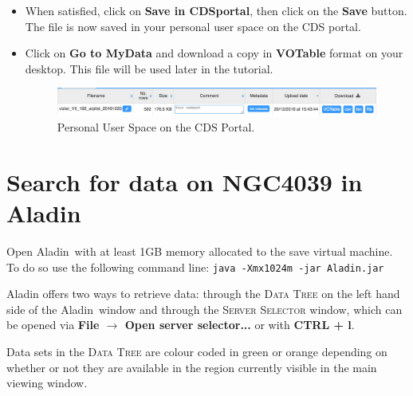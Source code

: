 \documentclass [a4paper, 12pt]{article}
\newcommand{\aladin}{{\textsc{A}{ladin}}}
\begin{document}
\begin{itemize}
\item When satisfied, click on \textbf{Save in CDSportal}, then click 
on the \textbf{Save} button. The file is now saved in your personal 
user space on the CDS portal.
\item Click on \textbf{Go to MyData} and download a copy in 
\textbf{VOTable} format on your desktop. This file will be used later 
in the tutorial.
\begin{figure}[H]
\center
\includegraphics[width=1  \textwidth]{../images/cdsportal_mydata.jpg}
\caption{Personal User Space on the CDS Portal.}
\label{fig:download}
\end{figure}
\end{itemize}



\section{Search for data on NGC4039 in \aladin}

Open \aladin\ with at least 1GB memory allocated to the save virtual 
machine. To do so use the following command line: \texttt{java -Xmx1024m -jar 
Aladin.jar}

Aladin offers two ways to retrieve data: through the \textsc{Data Tree} on the 
left hand side of the \aladin\ window and through the 
\textsc{Server Selector} window, which can be opened via \textbf{File 
$\rightarrow$ Open server selector...} or with \textbf{CTRL + l}. 

Data sets in the \textsc{Data Tree} are colour coded in green or orange 
depending on whether or not they are available in the region currently visible 
in the main viewing window. 
\end{document}
